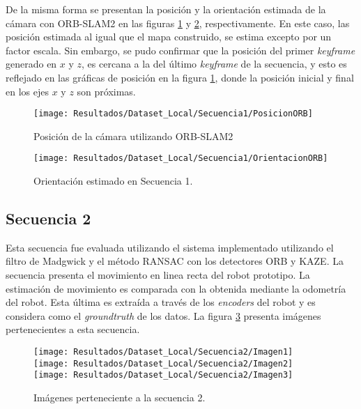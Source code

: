 De la misma forma se presentan la posición y la orientación estimada de la cámara con ORB-SLAM2 en las figuras \ref{imagen:Resultados/Dataset_Local/Secuencia3/PosicionORB} y \ref{imagen:Resultados/Dataset_Local/Secuencia1/OrientacionORB}, respectivamente. En este caso, las posición estimada al igual que el mapa construido, se estima excepto por un factor escala. Sin embargo, se pudo confirmar que la posición del primer \textit{keyframe} generado en $x$ y $z$, es cercana a la del último \textit{keyframe} de la secuencia, y esto es reflejado en las gráficas de posición en la figura \ref{imagen:Resultados/Dataset_Local/Secuencia3/PosicionORB}, donde la posición inicial y final en los ejes $x$ y $z$ son próximas.


\begin{figure}[H]
	\centering
	\texttt{[image: Resultados/Dataset\_Local/Secuencia1/PosicionORB]}
	\caption{Posición de la cámara utilizando ORB-SLAM2}
	\label{imagen:Resultados/Dataset_Local/Secuencia3/PosicionORB}
\end{figure}


\begin{figure}[H]
	\centering
	\texttt{[image: Resultados/Dataset\_Local/Secuencia1/OrientacionORB]}
	\caption[Orientación estimada en Secuencia 1 utilizando ORB-SLAM2]{Orientación estimado en Secuencia 1.}
	\label{imagen:Resultados/Dataset_Local/Secuencia1/OrientacionORB}
\end{figure}

\subsection{Secuencia 2}

Esta secuencia fue evaluada utilizando el sistema implementado utilizando el filtro de Madgwick y el método RANSAC con los detectores ORB y KAZE. La secuencia presenta el movimiento en linea recta del robot prototipo. La estimación de movimiento es comparada con la obtenida mediante la odometría del robot. Esta última es extraída a través de los \textit{encoders} del robot y es considera como el \textit{groundtruth} de los datos. La figura \ref{imagen:Resultados/Dataset_Local/Secuencia1/Imagen} presenta imágenes pertenecientes a esta secuencia.

\begin{figure}[H]
	\centering
	\texttt{[image: Resultados/Dataset\_Local/Secuencia2/Imagen1]}
	\texttt{[image: Resultados/Dataset\_Local/Secuencia2/Imagen2]}
	\texttt{[image: Resultados/Dataset\_Local/Secuencia2/Imagen3]}
	\caption[Imágenes perteneciente a la secuencia 2 del dataset local]{Imágenes perteneciente a la secuencia 2.}
	\label{imagen:Resultados/Dataset_Local/Secuencia1/Imagen}
\end{figure}



